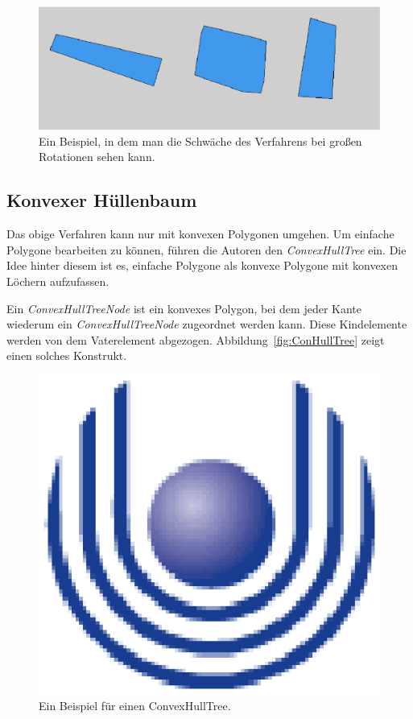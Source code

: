 \begin{figure}
	\centering
	\includegraphics[scale=0.6]{Rotation.eps}
	\caption[Die Schwächen des Verfahrens für große Rotationen]{Ein Beispiel, in dem man die Schwäche des Verfahrens bei großen Rotationen sehen kann.}
	\label{fig:BeispielschlechteRot}
\end{figure}

\subsection{Konvexer Hüllenbaum}

Das obige Verfahren kann nur mit konvexen Polygonen umgehen. Um einfache Polygone bearbeiten zu können, führen die Autoren den \textit{ConvexHullTree} ein. Die Idee hinter diesem ist es, einfache Polygone als konvexe Polygone mit konvexen Löchern aufzufassen. 

Ein \textit{ConvexHullTreeNode} ist ein konvexes Polygon, bei dem jeder Kante wiederum ein \textit{ConvexHullTreeNode} zugeordnet werden kann. Diese Kindelemente werden von dem Vaterelement abgezogen. Abbildung~\vref{fig:ConHullTree} zeigt einen solches Konstrukt.

\begin{figure}
	\centering
	\includegraphics{feu_logo2.eps}
	\caption{Ein Beispiel für einen ConvexHullTree.}
	\label{fig:ConHullTree}
\end{figure}

